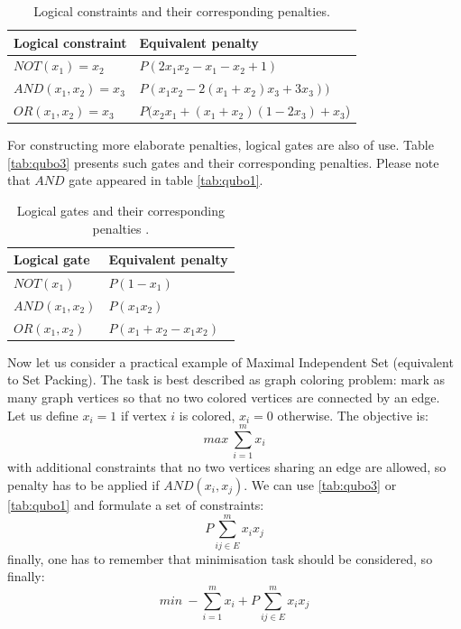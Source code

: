 \begin{table}[h]
\begin{center}
\begin{tabular}{ l l }
 Logical constraint & Equivalent penalty\\
  \hline 
 $NOT(x_1)=x_2$ & $P(2x_1x_2-x_1-x_2+1)$ \\  
 $AND(x_1, x_2)=x_3$ & $P(x_1x_2 - 2(x_1 + x_2)x_3 + 3x_3))$ \\
 $OR(x_1, x_2)=x_3$ & $P(x_2x_1 + (x_1+x_2)(1-2x_3)+x_3$) \\
\end{tabular}
\end{center}
\caption{Logical constraints and their corresponding penalties\cite{tanahashi_application_2019}\cite{zaman_pyqubo_2021}.}
\label{tab:qubo2}
\end{table}


For constructing more elaborate penalties, logical gates are also of use. Table \autoref{tab:qubo3} presents such gates and their corresponding penalties. Please note that $AND$ gate appeared in table \autoref{tab:qubo1}.
\begin{table}[h]
\begin{center}
\begin{tabular}{ l l }
 Logical gate & Equivalent penalty\\
 \hline
 $NOT(x_1)$ & $P(1-x_1)$ \\  
 $AND(x_1, x_2)$ & $P(x_1x_2)$ \\
 $OR(x_1, x_2)$ & $P(x_1+x_2-x_1x_2)$\\
\end{tabular}
\end{center}
\caption{Logical gates and their corresponding penalties \cite{tanahashi_application_2019}\cite{zaman_pyqubo_2021}.}
\label{tab:qubo3}
\end{table}

Now let us consider a practical example of Maximal Independent Set (equivalent to Set Packing). The task is best described as graph coloring problem: mark as many graph vertices so that no two colored vertices are connected by an edge. Let us define $x_i=1$ if vertex $i$ is colored, $x_i=0$ otherwise. The objective is:
\[max\ \sum_{i=1}^mx_i\]
with additional constraints that no two vertices sharing an edge are allowed, so penalty has to be applied if $AND(x_i, x_j)$. We can use \autoref{tab:qubo3} or \autoref{tab:qubo1} and formulate a set of constraints:
\[P\sum_{ij\in E}^m x_i x_j \]
finally, one has to remember that minimisation task should be considered, so finally:
\[min\ -\sum_{i=1}^mx_i + P\sum_{ij\in E}^m x_i x_j\]

